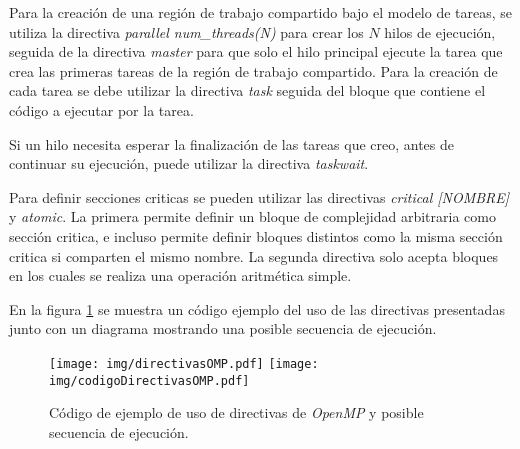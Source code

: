 Para la creación de una región de trabajo compartido bajo el modelo de tareas, se
utiliza la directiva \emph{parallel num\_threads(N)} para crear los $N$ hilos de
ejecución, seguida de la directiva \emph{master} para que solo el hilo principal
ejecute la tarea que crea las primeras tareas de la región de trabajo
compartido. Para la creación de cada tarea se debe utilizar la directiva
\emph{task} seguida del bloque que contiene el código a ejecutar por la tarea.

Si un hilo necesita esperar la finalización de las tareas que creo, antes de
continuar su ejecución, puede utilizar la directiva \emph{taskwait}.

Para definir secciones criticas se pueden utilizar las directivas \emph{critical
[NOMBRE]} y \emph{atomic}. La primera permite definir un bloque de complejidad
arbitraria como sección critica, e incluso permite definir bloques distintos
como la misma sección critica si comparten el mismo nombre. La segunda directiva
solo acepta bloques en los cuales se realiza una operación aritmética simple.

En la figura \ref{directivas} se muestra un código ejemplo del uso de las
directivas presentadas junto con un diagrama mostrando una posible secuencia de
ejecución.

\begin{figure}[!h]

	\centering

	\texttt{[image: img/directivasOMP.pdf]}
	\texttt{[image: img/codigoDirectivasOMP.pdf]}

	\caption{Código de ejemplo de uso de directivas de \emph{OpenMP} y
	posible secuencia de ejecución.}

	\label{directivas}

\end{figure}
